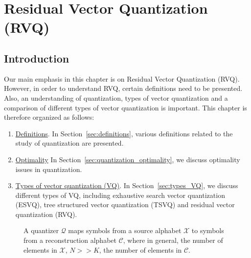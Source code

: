 %
%
%
\chapter{Residual Vector Quantization (RVQ)}
\label{chap_RVQ}	
\section{Introduction}
\label{sec:introduction}
Our main emphasis in this chapter is on Residual Vector Quantization (RVQ).  However, in order to understand RVQ, certain definitions need to be presented.  Also, an understanding of quantization, types of vector quantization and a comparison of different types of vector quantization is important.  This chapter is therefore organized as follows:

\begin{enumerate}
\item \underline{Definitions}.  In Section~\ref{sec:definitions}, various definitions related to the study of quantization are presented.
\item \underline{Optimality} In Section~\ref{sec:quantization_optimality}, we discuss optimality issues in quantization.
\item \underline{Types of vector quantization (VQ)}.  In Section~\ref{sec:types_VQ}, we discuss different types of VQ, including exhaustive search vector quantization (ESVQ),  tree structured vector quantization (TSVQ) and residual vector quantization (RVQ).
\end{enumerate}

								\begin{figure}[t]	
								\centering		
								\caption{A quantizer $\mathcal{Q}$ maps symbols from a source alphabet $\mathcal{X}$ to symbols from a reconstruction alphabet $\mathcal{C}$, where in general, the number of elements in $\mathcal{X}$, $N >> K$, the number of elements in $\mathcal{C}$.}
								\label{fig:Quantization_block_diagram}
								\end{figure}



